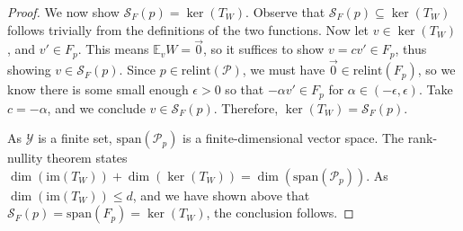 \documentclass[anon,12pt]{colt2021} %
\newcommand{\Comments}{1}
\newcommand{\mynote}[2]{\ifnum\Comments=1\textcolor{#1}{#2}\fi}
\newcommand{\raf}[1]{\mynote{green}{[RF: #1]}}
\newcommand{\jessie}[1]{\mynote{purple}{[JF: #1]}}
\newcommand{\relint}[1]{\mathrm{relint}(#1)}
\newcommand{\spn}{\mathrm{span}}
\newcommand{\E}{\mathbb{E}}
\renewcommand{\P}{\mathcal{P}}
\newcommand{\Scr}{\mathcal{S}}  %
\newcommand{\Y}{\mathcal{Y}}
\newcommand{\im}{\mathrm{im}}
\begin{document}
\begin{proof}
  We now show $\Scr_F(p) = \ker(T_W)$.
%  
%
  Observe that $\Scr_F(p) \subseteq \ker(T_W)$ follows trivially from the definitions of the two functions. 
  Now let $v \in \ker(T_W)$, and $v' \in F_p$.
  This means $\E_v W = \vec 0$, so it suffices to show $v = c v' \in F_p$, thus showing $v \in \Scr_F(p)$.
  Since $p \in \relint{\P}$, we must have $\vec 0 \in \relint{F_p}$, so we know there is some small enough $\epsilon > 0$ so that $-\alpha v' \in F_p$ for $\alpha \in (-\epsilon, \epsilon)$.
  Take $c = -\alpha$, and we conclude $v \in \Scr_F(p)$.
  Therefore, $\ker(T_W) = \Scr_F(p)$.
  
  As $\Y$ is a finite set, $\spn(\P_p)$ is a finite-dimensional vector space.
  The rank-nullity theorem states $\dim(\im(T_W)) + \dim(\ker(T_W)) = \dim(\spn(\P_p))$.
  As $\dim(\im(T_W)) \leq d$, and we have shown above that $\Scr_F(p) = \spn(F_p) = \ker(T_W)$, the conclusion follows.
\end{proof}
\end{document}
